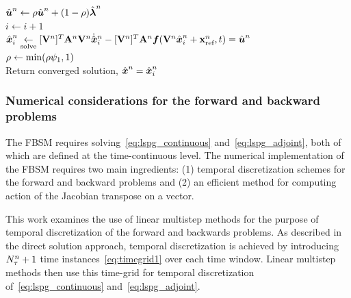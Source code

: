 \begin{algorithm}
{${\hat{\boldsymbol u}^{n}}  \leftarrow \rho {\hat{\boldsymbol u}^{n}} + (1 - \rho) \hat{\boldsymbol \lambda}^{n}$ \\
$i \leftarrow i+1$ \\
$\hat{ \boldsymbol x}^{n}_i \underset{\text{solve}}{\leftarrow} [\mathbf {V}^{n}]^T \mathbf{A}^{n} \mathbf {V}^{n} \dot{\hat{ \boldsymbol x}}^{n}_i   -  [\mathbf {V}^{n}]^T \mathbf{A}^{n} \boldsymbol f(\mathbf {V}^{n} \hat{ \boldsymbol x}^n_i + \mathbf{x}_\text{ref}^{n},t) =  {\hat{\boldsymbol u}^{n}} $
\\
{
$\rho \leftarrow \text{min}(\rho \psi_1,1)$ \\
}
}
Return converged solution, $\hat{ \boldsymbol x}^{n}= \hat{ \boldsymbol x}^{n}_i$
\end{algorithm}
\subsubsection{Numerical considerations for the forward and backward problems}
The FBSM requires solving~\eqref{eq:lspg_continuous} and~\eqref{eq:lspg_adjoint}, both of which are defined at the time-continuous level. 
The numerical implementation of the FBSM requires two main ingredients: (1) temporal discretization schemes for the forward and backward problems and (2) 
an efficient method for computing action of the Jacobian transpose on a vector.  

This work examines the use of linear multistep methods for the purpose of temporal discretization of the forward and 
backwards problems. As described in  
the direct solution approach, temporal discretization is achieved by introducing $N_{\tau}^{n} + 1$ time instances~\eqref{eq:timegrid1} over each time window. Linear multistep methods then use this time-grid for temporal discretization of~\eqref{eq:lspg_continuous} and~\eqref{eq:lspg_adjoint}. 

